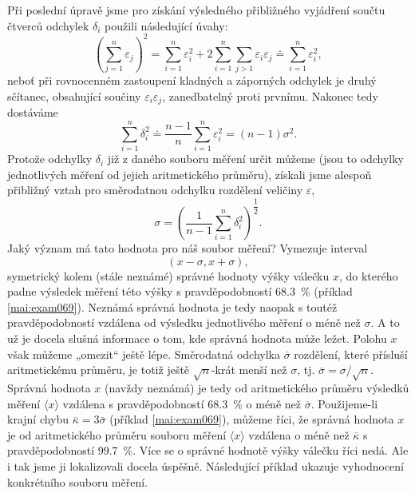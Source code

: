       Při poslední úpravě jsme pro získání výsledného přibližného vyjádření součtu čtverců odchylek
      \(\delta_i\) použili následující úvahy:
      \begin{equation*}
        \left(\sum_{j=1}^{n}\varepsilon_j\right)^2 = \sum_{i=1}^{n}\varepsilon_i^2 + 
        2\sum_{i=1}^{n}\sum_{j>1}\varepsilon_i\varepsilon_j \doteq \sum_{i=1}^{n}\varepsilon_i^2,
      \end{equation*}
      neboť při rovnocenném zastoupení kladných a záporných odchylek je druhý sčítanec, obsahující
      součiny \(\varepsilon_i\varepsilon_j\), zanedbatelný proti prvnímu. Nakonec tedy dostáváme
      \begin{equation*}
        \sum_{i=1}^{n}\delta_i^2 \doteq \dfrac{n-1}{n}\sum_{i=1}^{n}\varepsilon_i^2 = (n-1)\sigma^2.
      \end{equation*}
      Protože odchylky \(\delta_i\) již z daného souboru měření určit můžeme (jsou to odchylky 
      jednotlivých měření od jejich aritmetického průměru), získali jsme alespoň přibližný vztah 
      pro směrodatnou odchylku rozdělení veličiny \(\varepsilon\), 
      \begin{equation}\label{mai:eq074}
        \sigma = \left(\dfrac{1}{n-1}\sum_{i=1}^{n}\delta_i^2\right)^{\dfrac{1}{2}}.
      \end{equation}
      Jaký význam má tato hodnota pro náš soubor měření? Vymezuje interval
      \begin{equation*}
        (x - \sigma, x + \sigma),
      \end{equation*}
      symetrický kolem (stále neznámé) správné hodnoty výšky válečku \(x\), do kterého padne 
      výsledek měření této výšky s pravděpodobností \SI{68.3}{\percent} (příklad 
      \ref{mai:exam069}). Neznámá správná hodnota je tedy naopak s toutéž pravděpodobností vzdálena 
      od výsledku jednotlivého měření o méně než \(\sigma\). A to už je docela slušná informace o 
      tom, kde správná hodnota může ležet. Polohu \(x\) však můžeme „omezit“ ještě lépe. Směrodatná 
      odchylka \(\overline{\sigma}\) rozdělení, které přísluší aritmetickému průměru, je
      totiž ještě \(\sqrt{n}\)-krát menší než \(\sigma\), tj. \(\overline{\sigma}= 
      \sigma/\sqrt{n}\). Správná hodnota \(x\) (navždy neznámá) je tedy od aritmetického průměru 
      výsledků měření \(\langle x \rangle\) vzdálena s pravděpodobností \SI{68.3}{\percent} o méně 
      než \(\overline{\sigma}\). Použijeme-li krajní chybu \(\overline{\kappa} = 
      3\overline{\sigma}\) (příklad \ref{mai:exam069}), můžeme říci, že správná hodnota \(x\) je od
      aritmetického průměru souboru měření \(\langle x \rangle\) vzdálena o méně než 
      \(\overline{\kappa}\) s pravděpodobností \SI{99.7}{\percent}. Více se o správné hodnotě výšky 
      válečku říci nedá. Ale i tak jsme ji lokalizovali docela úspěšně. Následující příklad 
      ukazuje vyhodnocení konkrétního souboru měření.

